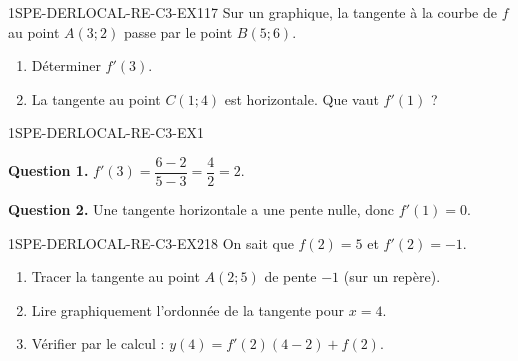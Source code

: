 

\begin{exercice}{1SPE-DERLOCAL-RE-C3-EX1}{1}{7}
Sur un graphique, la tangente à la courbe de $f$ au point $A(3;2)$ passe par le point $B(5;6)$.
\begin{enumerate}
  \item Déterminer $f'(3)$.
  \item La tangente au point $C(1;4)$ est horizontale. Que vaut $f'(1)$ ?
\end{enumerate}
\end{exercice}



\begin{corrige}{1SPE-DERLOCAL-RE-C3-EX1}


\textbf{Question 1.}
$f'(3) = \dfrac{6-2}{5-3} = \dfrac{4}{2} = 2.$

\textbf{Question 2.}
Une tangente horizontale a une pente nulle, donc $f'(1) = 0$.

\end{corrige}


\begin{exercice}{1SPE-DERLOCAL-RE-C3-EX2}{1}{8}
On sait que $f(2) = 5$ et $f'(2) = -1$.
\begin{enumerate}
  \item Tracer la tangente au point $A(2;5)$ de pente $-1$ (sur un repère).
  \item Lire graphiquement l'ordonnée de la tangente pour $x=4$.
  \item Vérifier par le calcul : $y(4) = f'(2)(4-2)+f(2)$.
\end{enumerate}
\end{exercice}

